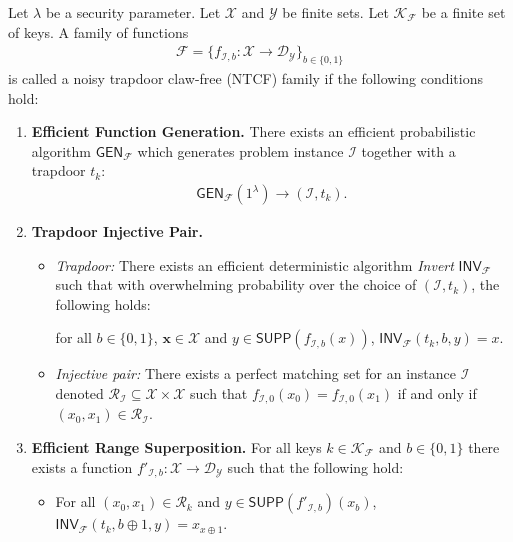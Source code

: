 \documentclass[cryptography,review,submit,pdftex,moreauthors,amsmath,amssymb,aps,strict]{Definitions/mdpi}
\begin{document}
\begin{Definition}
   Let $\lambda$ be a security parameter. Let $\mathcal{X}$ and $\mathcal{Y}$ be finite sets. Let $\mathcal{K}_{\mathcal{F}}$ be a finite set of keys. A family of functions
   \begin{align}
       \mathcal{F}=\{f_{\mathcal{I},b}:\mathcal{X}\to \mathcal{D}_{\mathcal{Y}}\}_{b\in\{0,1\}}
   \end{align}
is called a noisy trapdoor claw-free (NTCF) family if the following conditions hold:
\begin{enumerate}
    \item \textbf{Efficient Function Generation.} There exists an efficient probabilistic algorithm $\mathsf{GEN}_{\mathcal{F}}$ which generates problem instance $\mathcal{I}$ together with a trapdoor $t_{k}$:
    \begin{align}
        \mathsf{GEN}_{\mathcal{F}}(1^{\lambda})\to (\mathcal{I},t_k).
    \end{align}
    \item \textbf{Trapdoor Injective Pair.}
    \begin{itemize}
        \item \textit{Trapdoor:} There exists an efficient deterministic algorithm \textit{Invert} $\mathsf{INV}_\mathcal{F}$ such that with overwhelming probability over the choice of $(\mathcal{I},t_k)$, the following holds:
        \begin{center}
            for all $b\in\{0,1\}$, $\mathbf{x}\in \mathcal{X}$ and $y\in \mathsf{SUPP}(f_{\mathcal{I},b}(x))$, $\mathsf{INV}_\mathcal{F}(t_k,b,y)=x$.
        \end{center}
        \item \textit{Injective pair:} There exists a perfect matching set for an instance $\mathcal{I}$ denoted  $\mathcal{R}_{\mathcal{I}}\subseteq \mathcal{X}\times \mathcal{X}$ such that $f_{\mathcal{I},0}(x_0)=f_{\mathcal{I},0}(x_1)$ if and only if $(x_0,x_1)\in \mathcal{R}_{\mathcal{I}}$. 
    \end{itemize}
    \item \textbf{Efficient Range Superposition.} For all keys $k\in \mathcal{K}_{\mathcal{F}}$ and $b\in\{0,1\}$ there exists a function $f'_{\mathcal{I},b}:\mathcal{X}\to \mathcal{D}_{\mathcal{Y}}$ such that the following hold:
    \begin{itemize}
        \item For all $(x_0,x_1)\in \mathcal{R}_k$ and $y\in\mathsf{SUPP}(f'_{\mathcal{I},b})(x_b)$, $\mathsf{INV}_{\mathcal{F}}(t_k,b\oplus 1,y)=x_{x\oplus 1}$.

\end{itemize}
\end{enumerate}
\end{Definition}
\end{document}
